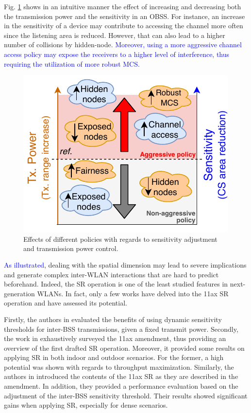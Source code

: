\documentclass[comsoc]{IEEEtran}
\begin{document}
	Fig. \ref{fig:policies_sr} shows in an intuitive manner the effect of increasing and decreasing both the transmission power and the sensitivity in an OBSS. For instance, an increase in the sensitivity of a device may contribute to accessing the channel more often since the listening area is reduced. However, that can also lead to a higher number of collisions by hidden-node. \textcolor{blue}{Moreover, using a more aggressive channel access policy may expose the receivers to a higher level of interference, thus requiring the utilization of more robust MCS.}
	\begin{figure}[ht!]
		\centering
		\includegraphics[width=0.8\columnwidth]{policies_sr}
		\caption{Effects of different policies with regards to sensitivity adjustment and transmission power control.}
		\label{fig:policies_sr}
	\end{figure}
	
	\textcolor{blue}{As illustrated}, dealing with the spatial dimension may lead to severe implications and generate complex inter-WLAN interactions that are hard to predict beforehand. Indeed, the SR operation is one of the least studied features in next-generation WLANs. In fact, only a few works have delved into the 11ax SR operation and have assessed its potential. 
	
	Firstly, the authors in \cite{mori2014performance} evaluated the benefits of using dynamic sensitivity thresholds for inter-BSS transmissions, given a fixed transmit power. Secondly, the work in \cite{qu2018survey} exhaustively surveyed the 11ax amendment, thus providing an overview of the first drafted SR operation. Moreover, it provided some results on applying SR in both indoor and outdoor scenarios. For the former, a high potential was shown with regards to throughput maximization. Similarly, the authors in \cite{shen2018research} introduced the contents of the 11ax SR as they are described in the amendment. In addition, they provided a performance evaluation based on the adjustment of the inter-BSS sensitivity threshold. Their results showed significant gains when applying SR, especially for dense scenarios. 
\end{document}
